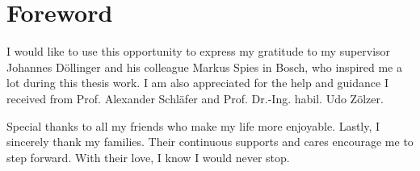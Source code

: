 \chapter*{Foreword}
\label{sec:vorwort}

I would like to use this opportunity to express my gratitude to my supervisor Johannes D\"ollinger and his colleague Markus Spies in Bosch, who inspired me a lot during this thesis work. I am also appreciated for the help and guidance I received from Prof. Alexander Schl\"afer and Prof. Dr.-Ing. habil. Udo Z\"olzer. 

Special thanks to all my friends who make my life more enjoyable. Lastly, I sincerely thank my families. Their continuous supports and cares encourage me to step forward. With their love, I know I would never stop. \\


